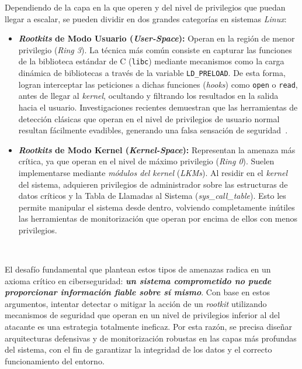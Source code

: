 Dependiendo de la capa en la que operen y del nivel de privilegios que puedan llegar a escalar, se pueden dividir en dos grandes categorías en sistemas \textit{Linux}:
\begin{itemize}
    \item \textbf{\textit{Rootkits} de Modo Usuario (\textit{User-Space}):} Operan en la región de menor privilegio (\textit{Ring 3}).
    La técnica más común consiste en capturar las funciones de la biblioteca estándar de C (\texttt{libc}) mediante mecanismos como la carga dinámica de bibliotecas a través de la variable \texttt{LD\_PRELOAD}.
    De esta forma, logran interceptar las peticiones a dichas funciones (\textit{hooks}) como \texttt{open} o \texttt{read}, antes de llegar al \textit{kernel}, ocultando y filtrando los resultados en la salida hacia el usuario.
    Investigaciones recientes demuestran que las herramientas de detección clásicas que operan en el nivel de privilegios de usuario normal resultan fácilmente evadibles, generando una falsa sensación de seguridad~\cite{rootkits}.
    
    \item \textbf{\textit{Rootkits} de Modo Kernel (\textit{Kernel-Space}):} Representan la amenaza más crítica, ya que operan en el nivel de máximo privilegio (\textit{Ring 0}).
    Suelen implementarse mediante \textit{módulos del kernel} (\textit{LKMs}). Al residir en el \textit{kernel} del sistema, adquieren privilegios de administrador sobre las estructuras de datos críticos y la Tabla de Llamadas al Sistema (\textit{sys\_call\_table}).
    Esto les permite manipular el sistema desde dentro, volviendo completamente inútiles las herramientas de monitorización que operan por encima de ellos con menos privilegios.
\end{itemize}

\

El desafío fundamental que plantean estos tipos de amenazas radica en un axioma crítico en ciberseguridad: \textbf{\textit{un sistema comprometido no puede proporcionar información fiable sobre sí mismo}}.
Con base en estos argumentos, intentar detectar o mitigar la acción de un \textit{rootkit} utilizando mecanismos de seguridad que operan en un nivel de privilegios inferior al del atacante es una estrategia totalmente ineficaz.
Por esta razón, se precisa diseñar arquitecturas defensivas y de monitorización robustas en las capas más profundas del sistema, con el fin de garantizar la integridad de los datos y el correcto funcionamiento del entorno.

